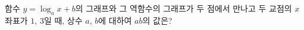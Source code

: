 함수 $y=\log_a x+b$의 그래프와 그 역함수의 그래프가 두 점에서 만나고 두 교점의 $x$좌표가 $1$, $3$일 때, 상수 $a$, $b$에 대하여 $ab$의 값은? 
